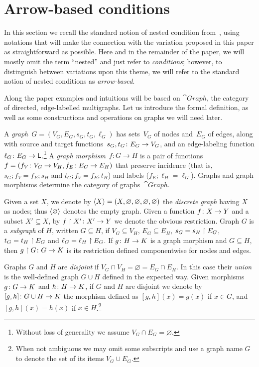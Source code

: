 \section{Arrow-based conditions}

In this section we recall the standard notion of nested condition from~\cite{Rensink-FOL}, using notations that will make the connection with the variation proposed in this paper as straightforward as possible. Here and in the remainder of the paper, we will mostly omit the term ``nested'' and just refer to \emph{conditions}; however, to distinguish between variations upon this theme, we will refer to the standard notion of nested conditions as \emph{arrow-based}.

Along the paper examples and intuitions will be based on $\cat{Graph}$, the category of directed, edge-labelled multigraphs. Let us introduce the formal definition, as well as some constructions and operations on graphs we will need later.

\begin{definition}\label{def:graph-and-morphism}
  A \emph{graph}~$G = (V_G,E_G,s_G,t_G,\ell_G)$ has sets~$V_G$ of nodes and~$E_G$ of edges, along with source and target functions~$s_G,t_G\colon E_G\rightarrow V_G$, and an edge-labeling function $\ell_G\colon E_G \rightarrow \mathsf{L}$.\footnote{Without loss of generality we assume $V_G \cap E_G= \varnothing$.}
  A \emph{graph morphism}~$f:G\to H$ is a pair of functions~$f = (f_V\colon V_G\rightarrow V_H, f_E\colon E_G\rightarrow E_H)$ that preserve incidence (that is, $s_G; f_V = f_E;s_H$ and $t_G; f_V = f_E ; t_H$) and labels ($f_E;\ell_H = \ell_G$).
  Graphs and graph morphisms determine the category of graphs~$\cat{Graph}$.

  Given a set $X$, we denote by $\langle X \rangle = (X,\varnothing,\varnothing,\varnothing,\varnothing)$ the \emph{discrete graph} having $X$ as nodes; thus $\langle \varnothing \rangle$ denotes the empty graph. Given a function $f\colon X \rightarrow Y$ and a subset $X' \subseteq X$, by $f\restriction X'\colon X' \rightarrow Y$ we denote the obvious restriction. Graph $G$ is a \emph{subgraph} of $H$, written $G \subseteq H$, if $V_G \subseteq V_H$, $E_G \subseteq E_H$, $s_G = s_H\restriction E_G$, $t_G = t_H\restriction E_G$ and $\ell_G = \ell_H\restriction E_G$. If $g \colon H \rightarrow K$ is a graph morphism and $G \subseteq H$, then $g \restriction G \colon G \rightarrow K$ is its restriction defined componentwise for nodes and edges.  

  Graphs $G$ and $H$ are \emph{disjoint} if $V_G \cap V_H = \varnothing = E_G \cap E_H$. In this case their \emph{union} is the well-defined graph  $G \cup H$ defined in the expected way. Given morphisms $g\colon G \rightarrow K$ and $h \colon H \rightarrow K$, if $G$ and $H$ are disjoint we denote by $[g,h]\colon G\cup H \rightarrow K$ the morphism defined as $[g,h](x) = g(x)$ if $x \in G$, and $[g,h](x) = h(x)$ if $x \in H$.\footnote{When not ambiguous we may omit some subscripts and use a graph name $G$ to denote the set of its items $V_G \cup E_G$.}
\end{definition}

